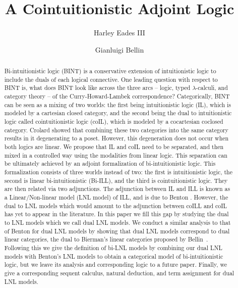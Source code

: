 \documentclass{lmcs}
\date{}
\begin{document}
\title{A Cointuitionistic Adjoint Logic}
\author{Harley Eades III}
\address{Computer Science, Augusta University, Augusta, GA}

\author{Gianluigi Bellin}
\address{Dipartimento di Informatica, Universit\`{a} di Verona, Strada Le Grazie, 37134 Verona, Italy}

\maketitle 

\begin{abstract}
Bi-intuitionistic logic (BINT) is a conservative extension of
intuitionistic logic to include the duals of each logical
connective. One leading question with respect to BINT is, what does
BINT look like across the three arcs -- logic, typed
$\lambda$-calculi, and category theory -- of the Curry-Howard-Lambek
correspondence?  Categorically, BINT can be seen as a mixing of two
worlds: the first being intuitionistic logic (IL), which is modeled by
a cartesian closed category, and the second being the dual to
intuitionistic logic called cointuitionistic logic (coIL), which is
modeled by a cocartesian coclosed category.  Crolard
\cite{Crolard:2001} showed that combining these two categories into
the same category results in it degenerating to a poset.  However,
this degeneration does not occur when both logics are linear.  We
propose that IL and coIL need to be separated, and then mixed in a
controlled way using the modalities from linear logic.  This
separation can be ultimately achieved by an adjoint formalization of
bi-intuitionistic logic.  This formalization consists of three worlds
instead of two: the first is intuitionistic logic, the second is
linear bi-intuitionistic (Bi-ILL), and the third is cointuitionistic
logic.  They are then related via two adjunctions.  The adjunction
between IL and ILL is known as a Linear/Non-linear model (LNL model)
of ILL, and is due to Benton \cite{Benton:1994}.  However, the dual to
LNL models which would amount to the adjunction between coILL and coIL
has yet to appear in the literature.  In this paper we fill this gap
by studying the dual to LNL models which we call dual LNL models.  We
conduct a similar analysis to that of Benton for dual LNL models by
showing that dual LNL models correspond to dual linear categories, the
dual to Bierman's \cite{Bierman:1994} linear categories proposed by
Bellin~\cite{Bellin:2012}.  Following this we give the definition of
bi-LNL models by combining our dual LNL models with Benton's LNL
models to obtain a categorical model of bi-intuitionistic logic, but
we leave its analysis and corresponding logic to a future paper.
Finally, we give a corresponding sequent calculus, natural deduction,
and term assignment for dual LNL models.
\end{abstract}
\end{document}
